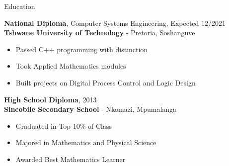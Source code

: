 \documentclass{resume} %
\newcommand{\sepspace}{\vspace*{1em}}           %
\begin{document}
\begin{rSection}{Education}

        \textbf{National Diploma}, Computer Systems Engineering, Expected 12/2021 \\
        \textbf{Tshwane University of Technology} - Pretoria, Soshanguve
        \begin{itemize}[noitemsep,topsep=-6pt]
          \item Passed C++ programming with distinction
          \item Took Applied Mathematics modules
          \item Built projects on Digital Process Control and Logic Design
        \end{itemize}

        \sepspace

        \textbf{High School Diploma}, 2013\\
        \textbf{Sincobile Secondary School} - Nkomazi, Mpumalanga
        \begin{itemize}[noitemsep,topsep=-6pt]
          \item Graduated in Top 10\% of Class
          \item Majored in Mathematics and Physical Science
          \item Awarded Best Mathematics Learner
        \end{itemize}

    
    
\end{rSection}
\end{document}

